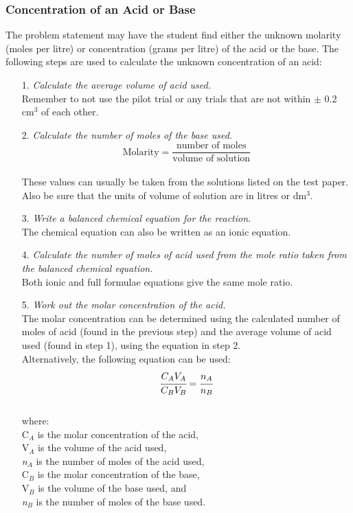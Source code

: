 \subsubsection{Concentration of an Acid or Base}

The problem statement may have the student find either the unknown molarity (moles per litre) or concentration (grams per litre) of the acid or the base. The following steps are used to calculate the unknown concentration of an acid:

\begin{enumerate}
\item[1.] \textit{Calculate the average volume of acid used.}\\
Remember to not use the pilot trial or any trials that are not within $\pm$ 0.2 cm$^3$ of each other.
\item[2.] \textit{Calculate the number of moles of the base used.}\\
$$\text{Molarity} = \frac{\text{number of moles}}{\text{volume of solution}}$$\\
These values can usually be taken from the solutions listed on the test paper. Also be sure that the units of volume of solution are in litres or dm$^3$.
\item[3.] \textit{Write a balanced chemical equation for the reaction.}\\
The chemical equation can also be written as an ionic equation.
\item[4.] \textit{Calculate the number of moles of acid used from the mole ratio taken from the balanced chemical equation.}\\
Both ionic and full formulae equations give the same mole ratio.
\item[5.] \textit{Work out the molar concentration of the acid.}\\
The molar concentration can be determined using the calculated number of moles of acid (found in the previous step) and the average volume of acid used (found in step 1), using the equation in step 2.\\
Alternatively, the following equation can be used:\\
$$\cfrac{C_AV_A}{C_BV_B} = \cfrac{n_A}{n_B}$$\\

where:\\
C$_A$ is the molar concentration of the acid,\\
V$_A$ is the volume of the acid used,\\
\textit{n}$_A$ is the number of moles of the acid used,\\
C$_B$ is the molar concentration of the base,\\
V$_B$ is the volume of the base used, and\\
\textit{n}$_B$ is the number of moles of the base used.\\
\end{enumerate}
